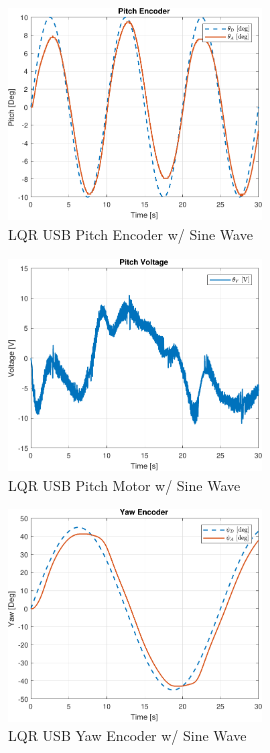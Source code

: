 \documentclass[fontsize=11pt, %
                             paper=letter, %
                             openany, %
                             captions=tableheading,
                             index=totoc,
                             hyperref]{labbook}
\begin{document}
\begin{addmargin}[0cm]{0cm}
\begin{figure}[H]
  \centering
  \includegraphics[width=0.6\textwidth]{figs/matlab/LQR/P_USB/Pitch_Pos_LQR_USB_SIN}
  \caption{LQR USB Pitch Encoder w/ Sine Wave}
  \label{fig:Pitch_Pos_LQR_USB_SIN}
\end{figure}

\begin{figure}[H]
  \centering
  \includegraphics[width=0.6\textwidth]{figs/matlab/LQR/P_USB/Pitch_Volt_LQR_USB_SIN}
  \caption{LQR USB Pitch Motor w/ Sine Wave}
  \label{fig:Pitch_Volt_LQR_USB_SIN}
\end{figure}

\begin{figure}[H]
  \centering
  \includegraphics[width=0.6\textwidth]{figs/matlab/LQR/P_USB/Yaw_Pos_LQR_USB_SIN}
  \caption{LQR USB Yaw Encoder w/ Sine Wave}
  \label{fig:Yaw_Pos_LQR_USB_SIN}
\end{figure}


\end{addmargin}
\end{document}
